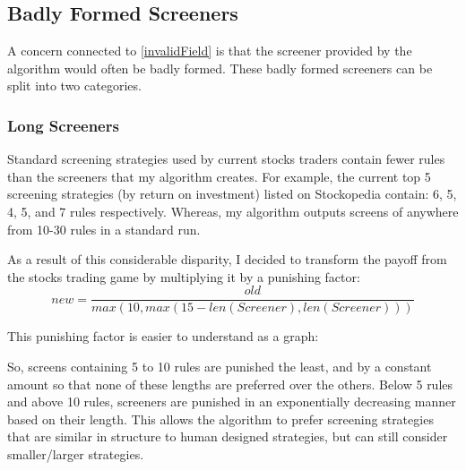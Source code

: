 \subsection{Badly Formed Screeners}
A concern connected to \ref{invalidField} is that the screener provided by the algorithm would often be badly formed. These badly formed screeners can be split into two categories.

\subsubsection{Long Screeners} \label{longScreeners}
Standard screening strategies used by current stocks traders contain fewer rules than the screeners that my algorithm creates. For example, the current top 5 screening strategies (by return on investment) listed on Stockopedia contain: 6, 5, 4, 5, and 7 rules respectively. \cite{stockopediaScreens} Whereas, my algorithm outputs screens of anywhere from 10-30 rules in a standard run. \newline

As a result of this considerable disparity, I decided to transform the payoff from the stocks trading game by multiplying it by a punishing factor:
\begin{equation}
    new = \frac{old}{max(10, max(15 - len(Screener), len(Screener)))}
\end{equation}

This punishing factor is easier to understand as a graph: \newline
\begin{center}
\end{center}

So, screens containing 5 to 10 rules are punished the least, and by a constant amount so that none of these lengths are preferred over the others. Below 5 rules and above 10 rules, screeners are punished in an exponentially decreasing manner based on their length. This allows the algorithm to prefer screening strategies that are similar in structure to human designed strategies, but can still consider smaller/larger strategies.

